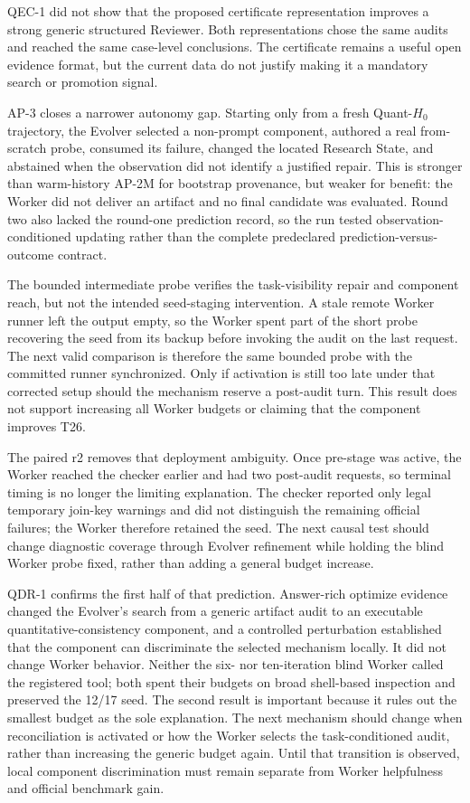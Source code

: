 QEC-1 did not show that the proposed certificate representation improves a
strong generic structured Reviewer. Both representations chose the same audits
and reached the same case-level conclusions. The certificate remains a useful
open evidence format, but the current data do not justify making it a mandatory
search or promotion signal.

AP-3 closes a narrower autonomy gap. Starting only from a fresh Quant-$H_0$
trajectory, the Evolver selected a non-prompt component, authored a real
from-scratch probe, consumed its failure, changed the located Research State,
and abstained when the observation did not identify a justified repair. This
is stronger than warm-history AP-2M for bootstrap provenance, but weaker for
benefit: the Worker did not deliver an artifact and no final candidate was
evaluated. Round two also lacked the round-one prediction record, so the run
tested observation-conditioned updating rather than the complete predeclared
prediction-versus-outcome contract.

The bounded intermediate probe verifies the task-visibility repair and
component reach, but not the intended seed-staging intervention. A stale remote
Worker runner left the output empty, so the Worker spent part of the short
probe recovering the seed from its backup before invoking the audit on the
last request. The next valid comparison is therefore the same bounded probe
with the committed runner synchronized. Only if activation is still too late
under that corrected setup should the mechanism reserve a post-audit turn.
This result does not support increasing all Worker budgets or claiming that the
component improves T26.

The paired r2 removes that deployment ambiguity. Once pre-stage was active, the
Worker reached the checker earlier and had two post-audit requests, so terminal
timing is no longer the limiting explanation. The checker reported only legal
temporary join-key warnings and did not distinguish the remaining official
failures; the Worker therefore retained the seed. The next causal test should
change diagnostic coverage through Evolver refinement while holding the blind
Worker probe fixed, rather than adding a general budget increase.

QDR-1 confirms the first half of that prediction. Answer-rich optimize evidence
changed the Evolver's search from a generic artifact audit to an executable
quantitative-consistency component, and a controlled perturbation established
that the component can discriminate the selected mechanism locally. It did not
change Worker behavior. Neither the six- nor ten-iteration blind Worker called
the registered tool; both spent their budgets on broad shell-based inspection
and preserved the 12/17 seed. The second result is important because it rules
out the smallest budget as the sole explanation. The next mechanism should
change when reconciliation is activated or how the Worker selects the
task-conditioned audit, rather than increasing the generic budget again. Until
that transition is observed, local component discrimination must remain
separate from Worker helpfulness and official benchmark gain.

